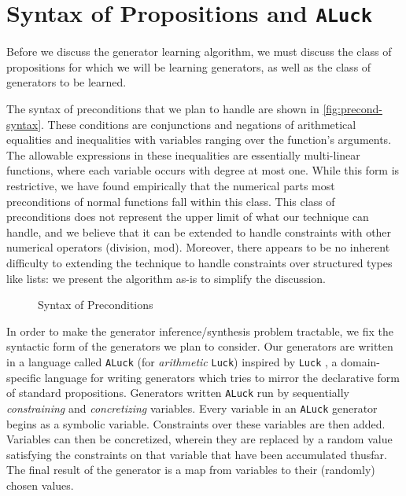\documentclass[10pt,a4paper]{article}
\begin{document}
\section{Syntax of Propositions and \texttt{ALuck}}
\label{sec:luck}

Before we discuss the generator learning algorithm, we must discuss the class of propositions for which we will be learning generators, as well as the class of generators to be learned.

The syntax of preconditions that we plan to handle are shown in \autoref{fig:precond-syntax}. These conditions are conjunctions and negations of arithmetical equalities and inequalities with variables ranging over the function's arguments. The allowable expressions in these inequalities are essentially multi-linear functions, where each variable occurs with degree at most one. While this form is restrictive, we have found empirically that the numerical parts most preconditions of normal functions fall within this class. This class of preconditions does not represent the upper limit of what our technique can handle, and we believe that it can be extended to handle constraints with other numerical operators (division, mod). Moreover, there appears to be no inherent difficulty to extending the technique to handle constraints over structured types like lists: we present the algorithm as-is to simplify the discussion.

\begin{figure}
\caption{Syntax of Preconditions}
\label{fig:precond-syntax}
\end{figure}

In order to make the generator inference/synthesis problem tractable, we fix the syntactic form of the generators we plan to consider. Our generators are written in a language called \texttt{ALuck} (for \textit{arithmetic} \texttt{Luck}) inspired by \texttt{Luck} \cite{}, a domain-specific language for writing generators which tries to mirror the declarative form of standard propositions. Generators written \texttt{ALuck} run by sequentially \textit{constraining} and \textit{concretizing} variables. Every variable in an \texttt{ALuck} generator begins as a symbolic variable. Constraints over these variables are then added. Variables can then be concretized, wherein they are replaced by a random value satisfying the constraints on that variable that have been accumulated thusfar. The final result of the generator is a map from variables to their (randomly) chosen values.
\end{document}
